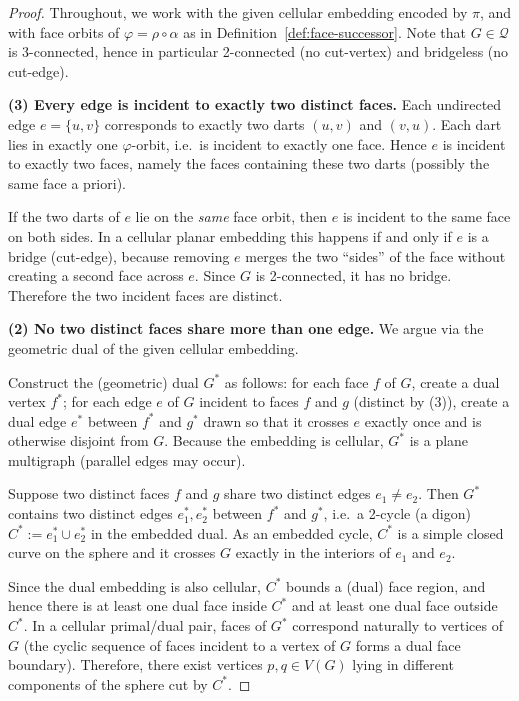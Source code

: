 \documentclass[12pt]{article}
\theoremstyle{definition}
\begin{document}
\begin{proof}
Throughout, we work with the given cellular embedding encoded by $\pi$, and with face orbits of
$\varphi=\rho\circ\alpha$ as in Definition~\ref{def:face-successor}. Note that $G\in\mathcal{Q}$ is 3-connected,
hence in particular 2-connected (no cut-vertex) and bridgeless (no cut-edge).

\medskip
\noindent\textbf{(3) Every edge is incident to exactly two distinct faces.}
Each undirected edge $e=\{u,v\}$ corresponds to exactly two darts $(u,v)$ and $(v,u)$.
Each dart lies in exactly one $\varphi$-orbit, i.e.\ is incident to exactly one face.
Hence $e$ is incident to exactly two faces, namely the faces containing these two darts
(possibly the same face a priori).

If the two darts of $e$ lie on the \emph{same} face orbit, then $e$ is incident to the same face on both
sides. In a cellular planar embedding this happens if and only if $e$ is a bridge (cut-edge), because
removing $e$ merges the two “sides” of the face without creating a second face across $e$.
Since $G$ is 2-connected, it has no bridge. Therefore the two incident faces are distinct.

\medskip
\noindent\textbf{(2) No two distinct faces share more than one edge.}
We argue via the geometric dual of the given cellular embedding.

Construct the (geometric) dual $G^*$ as follows: for each face $f$ of $G$, create a dual vertex $f^*$;
for each edge $e$ of $G$ incident to faces $f$ and $g$ (distinct by (3)), create a dual edge $e^*$
between $f^*$ and $g^*$ drawn so that it crosses $e$ exactly once and is otherwise disjoint from $G$.
Because the embedding is cellular, $G^*$ is a plane multigraph (parallel edges may occur).

Suppose two distinct faces $f$ and $g$ share two distinct edges $e_1\neq e_2$.
Then $G^*$ contains two distinct edges $e_1^*,e_2^*$ between $f^*$ and $g^*$, i.e.\ a 2-cycle
(a digon) $C^* := e_1^* \cup e_2^*$ in the embedded dual.
As an embedded cycle, $C^*$ is a simple closed curve on the sphere and it crosses $G$
exactly in the interiors of $e_1$ and $e_2$.

Since the dual embedding is also cellular, $C^*$ bounds a (dual) face region, and hence there is at least
one dual face inside $C^*$ and at least one dual face outside $C^*$. In a cellular primal/dual pair,
faces of $G^*$ correspond naturally to vertices of $G$ (the cyclic sequence of faces incident to a vertex
of $G$ forms a dual face boundary). Therefore, there exist vertices $p,q\in V(G)$ lying in different
components of the sphere cut by $C^*$.


\end{proof}
\end{document}
